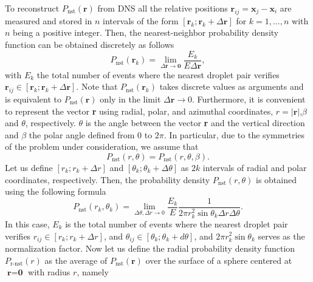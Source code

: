 To reconstruct $P_\text{nst}(\textbf{r})$ from DNS all the relative positions $\textbf{r}_{ij}  = \textbf{x}_j - \textbf{x}_i$ are measured and stored in $n$ intervals of the form $[\textbf{r}_k; \textbf{r}_k+\Delta \textbf{r}]$ for $k = 1,\ldots, n$ with $n$ being a positive integer.
Then, the nearest-neighbor probability density function can be obtained discretely as follows
\begin{equation}
    P_\text{nst}(\textbf{r}_k)
    =\lim_{\Delta \textbf{r} \to \bm 0} \frac{E_k}{E \Delta \textbf{r}},
    \label{eq:vec_cond}
\end{equation}
with $E_k$ the total number of events where the nearest droplet pair verifies $\textbf{r}_{ij} \in [\textbf{r}_k ; \textbf{r}_k + \Delta \textbf{r}]$.
Note that $P_\text{nst}(\textbf{r}_k)$ takes discrete values as arguments and is equivalent to $P_\text{nst}(\textbf{r})$ only in the limit $\Delta \textbf{r} \to 0$. 
Furthermore, it is convenient to represent the vector \textbf{r} using radial, polar, and azimuthal coordinates,  $r = |\textbf{r}|$,$\beta$ and $\theta$, respectively. 
$\theta$ is the angle between the vector \textbf{r} and the vertical direction and $\beta$ the polar angle defined from $0$ to $2\pi$. 
In particular, due to the symmetries of the problem under consideration, we assume that
\begin{equation}
    P_\text{nst}(r,\theta)
    = P_\text{nst}(r,\theta,\beta). 
\end{equation}
Let us define $[r_k; r_k+\Delta r]$ and $[\theta_k; \theta_k+\Delta \theta]$  as $2k$ intervals of radial and polar coordinates, respectively. 
Then, the probability density $P_\text{nst}(r,\theta)$ is obtained using the following formula
\begin{equation}
    P_\text{nst}(r_k,\theta_k)
    =
    \lim_{\Delta \theta , \Delta r \to 0}
    \frac{E_k}{E}
    \frac{1}{2\pi  r_k^2 \sin \theta_k \Delta r \Delta \theta}.
    \label{eq:Ptheta_r}
\end{equation}
In this case, $E_k$ is the total number of events where the nearest droplet pair verifies $r_{ij} \in [r_k ; r_k + \Delta r]$, and $\theta_{ij} \in [\theta_k; \theta_k+d\theta]$, and $2\pi  r_k^2 \sin \theta_k$ serves as the normalization factor. 
Now let us define the radial probability density function  $P_\text{r-nst}(r)$ as the average of $P_\text{nst}(\textbf{r})$ over the surface of a sphere centered at $\textbf{r}=\textbf{0}$ with radius $r$, namely
